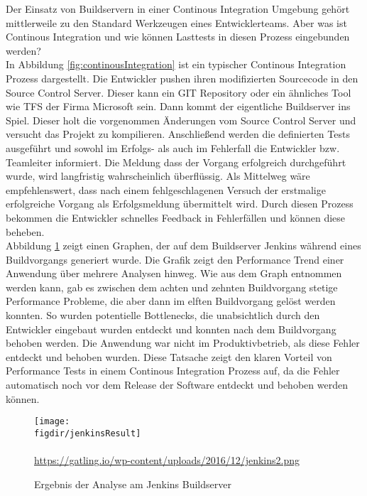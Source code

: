 Der Einsatz von Buildservern in einer Continous Integration Umgebung gehört mittlerweile zu den Standard Werkzeugen eines Entwicklerteams. Aber was ist Continous Integration und wie können Lasttests in diesen Prozess eingebunden werden?\\
In Abbildung \ref{fig:continousIntegration} ist ein typischer Continous Integration Prozess dargestellt. Die Entwickler pushen ihren modifizierten Sourcecode in den Source Control Server. Dieser kann ein GIT Repository oder ein ähnliches Tool wie \ac{TFS} der Firma Microsoft sein. Dann kommt der eigentliche Buildserver ins Spiel. Dieser holt die vorgenommen Änderungen vom Source Control Server und versucht das Projekt zu kompilieren. Anschließend werden die definierten Tests ausgeführt und sowohl im Erfolgs- als auch im Fehlerfall die Entwickler bzw. Teamleiter informiert. Die Meldung dass der Vorgang erfolgreich durchgeführt wurde, wird langfristig wahrscheinlich überflüssig. Als Mittelweg wäre empfehlenswert, dass nach einem fehlgeschlagenen Versuch der erstmalige erfolgreiche Vorgang als Erfolgsmeldung übermittelt wird. Durch diesen Prozess bekommen die Entwickler schnelles Feedback in Fehlerfällen und können diese beheben.\\
Abbildung \ref{fig:jenkinsBuildResult} zeigt einen Graphen, der auf dem Buildserver \glqq Jenkins\grqq{} während eines Buildvorgangs generiert wurde. Die Grafik zeigt den \glqq Performance Trend\grqq{} einer Anwendung über mehrere Analysen hinweg. Wie aus dem Graph entnommen werden kann, gab es zwischen dem achten und zehnten Buildvorgang stetige Performance Probleme, die aber dann im elften Buildvorgang gelöst werden konnten. So wurden potentielle Bottlenecks, die unabsichtlich durch den Entwickler eingebaut wurden entdeckt und konnten nach dem Buildvorgang behoben werden. Die Anwendung war nicht im Produktivbetrieb, als diese Fehler entdeckt und behoben wurden. Diese Tatsache zeigt den klaren Vorteil von Performance Tests in einem Continous Integration Prozess auf, da die Fehler automatisch noch vor dem Release der Software entdeckt und behoben werden können.
\begin{figure}
	{\caption{Ergebnis der Analyse am Jenkins Buildserver}
		\label{fig:jenkinsBuildResult}}
	{\texttt{[image: \\figdir/jenkinsResult]}}\\~\\
				\tiny{\quelle\url{https://gatling.io/wp-content/uploads/2016/12/jenkins2.png}}
\end{figure}


